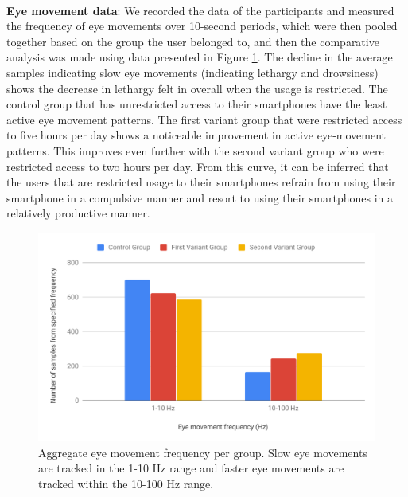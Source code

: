 \documentclass{article}
\begin{document}
\paragraph{} \textbf{Eye movement data}: We recorded the data of the participants and measured the frequency of eye movements over 10-second periods, which were then pooled together based on the group the user belonged to, and then the comparative analysis was made using data presented in Figure \ref{fig:res_eye_movement}. The decline in the average samples indicating slow eye movements (indicating lethargy and drowsiness) shows the decrease in lethargy felt in overall when the usage is restricted. The control group that has unrestricted access to their smartphones have the least active eye movement patterns. The first variant group that were restricted access to five hours per day shows a noticeable improvement in active eye-movement patterns. This improves even further with the second variant group who were restricted access to two hours per day. From this curve, it can be inferred that the users that are restricted usage to their smartphones refrain from using their smartphone in a compulsive manner and resort to using their smartphones in a relatively productive manner.

\begin{figure}[hbtp]
    \centering
    \includegraphics[width=\textwidth]{eye.pdf}
    \caption{Aggregate eye movement frequency per group. Slow eye movements are tracked in the 1-10 Hz range and faster eye movements are tracked within the 10-100 Hz range.}
    \label{fig:res_eye_movement}
\end{figure}
\end{document}
